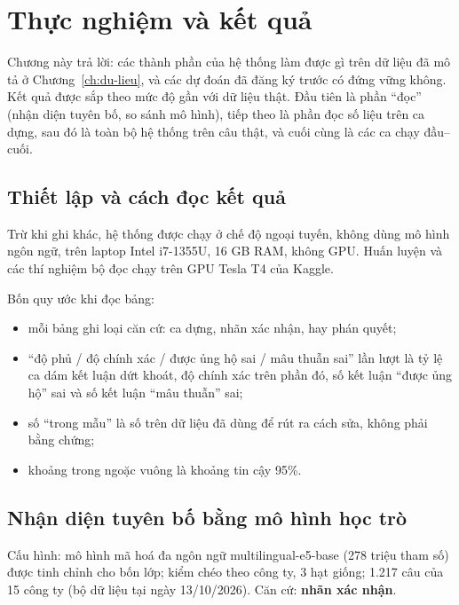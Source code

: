 \chapter{Thực nghiệm và kết quả}\label{ch:ket-qua}

Chương này trả lời: các thành phần của hệ thống làm được gì trên dữ liệu đã mô tả ở Chương~\ref{ch:du-lieu}, và các dự đoán đã đăng ký trước có đứng vững không. Kết quả được sắp theo mức độ gần với dữ liệu thật. Đầu tiên là phần “đọc” (nhận diện tuyên bố, so sánh mô hình), tiếp theo là phần đọc số liệu trên ca dựng, sau đó là toàn bộ hệ thống trên câu thật, và cuối cùng là các ca chạy đầu–cuối.

\section{Thiết lập và cách đọc kết quả}

Trừ khi ghi khác, hệ thống được chạy ở chế độ ngoại tuyến, không dùng mô hình ngôn ngữ, trên laptop Intel i7-1355U, 16 GB RAM, không GPU. Huấn luyện và các thí nghiệm bộ đọc chạy trên GPU Tesla T4 của Kaggle.

Bốn quy ước khi đọc bảng:
\begin{itemize}
\item mỗi bảng ghi loại căn cứ: ca dựng, nhãn xác nhận, hay phán quyết;
\item “độ phủ / độ chính xác / được ủng hộ sai / mâu thuẫn sai” lần lượt là tỷ lệ ca dám kết luận dứt khoát, độ chính xác trên phần đó, số kết luận “được ủng hộ” sai và số kết luận “mâu thuẫn” sai;
\item số “trong mẫu” là số trên dữ liệu đã dùng để rút ra cách sửa, không phải bằng chứng;
\item khoảng trong ngoặc vuông là khoảng tin cậy 95\%.
\end{itemize}

\section{Nhận diện tuyên bố bằng mô hình học trò}\label{sec:t1-kq}

Cấu hình: mô hình mã hoá đa ngôn ngữ multilingual-e5-base (278 triệu tham số) được tinh chỉnh cho bốn lớp; kiểm chéo theo công ty, 3 hạt giống; 1.217 câu của 15 công ty (bộ dữ liệu tại ngày 13/10/2026). Căn cứ: \textbf{nhãn xác nhận}.

